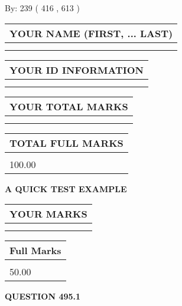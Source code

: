 \documentclass[12pt]{article}
\begin{document}
   
\hspace{1.0in} By: 
 239 ( 416 ,  613 )
   
   
   
   
\newpage 
\setcounter{page}{ 
   495001 } 
   
   
   
   
\noindent\begin{tabular}{|l|}
\hline
YOUR NAME (FIRST, ... LAST)  \\
\hline
 \\ 
 \\ 
\hline
\end{tabular}
\hspace{0.05in} \begin{tabular}{|l|}
\hline
 YOUR   ID   INFORMATION  \\
\hline
 \\ 
 \\ 
\hline
\end{tabular}
   
   
\vspace{0.2in}\noindent\begin{tabular}{|l|}
\hline
YOUR TOTAL MARKS  \\
\hline
 \\ 
 \\ 
\hline
\end{tabular}
\hspace{0.05in} \begin{tabular}{|l|}
\hline
TOTAL FULL MARKS  \\
\hline
 \\ 
100.00 \\
\hline
\end{tabular}
   
   
 \vspace{0.2in}
{\LARGE {\textbf{ A QUICK TEST EXAMPLE}}}
   
   
  
\vspace{0.2in}
  
\noindent\begin{tabular}{|l|}
\hline
 YOUR MARKS  \\
\hline
 \\ 
 \\ 
\hline
\end{tabular}
\hspace{0.05in} \begin{tabular}{|l|}
\hline
 Full Marks  \\
\hline
 \\ 
50.00 \\
\hline
\end{tabular}
{\textbf{\Large{QUESTION
495.1 
}}}
  
\end{document}
